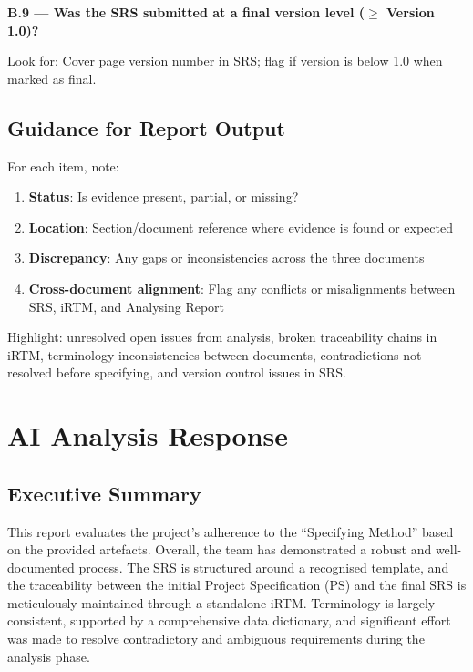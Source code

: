 \documentclass[11pt,a4paper]{article}
\begin{document}
\vspace{0.4em}

\textbf{B.9 --- Was the SRS submitted at a final version level ($\geq$ Version 1.0)?}

Look for: Cover page version number in SRS; flag if version is below 1.0 when marked as final.

\subsection*{Guidance for Report Output}

For each item, note:

\begin{enumerate}
\item \textbf{Status}: Is evidence present, partial, or missing?
\item \textbf{Location}: Section/document reference where evidence is found or expected
\item \textbf{Discrepancy}: Any gaps or inconsistencies across the three documents
\item \textbf{Cross-document alignment}: Flag any conflicts or misalignments between SRS, iRTM, and Analysing Report
\end{enumerate}

Highlight: unresolved open issues from analysis, broken traceability chains in iRTM, terminology inconsistencies between documents, contradictions not resolved before specifying, and version control issues in SRS.

\newpage
\section{AI Analysis Response}

\subsection{Executive Summary}

This report evaluates the project's adherence to the ``Specifying Method'' based on the provided artefacts. Overall, the team has demonstrated a robust and well-documented process. The SRS is structured around a recognised template, and the traceability between the initial Project Specification (PS) and the final SRS is meticulously maintained through a standalone iRTM. Terminology is largely consistent, supported by a comprehensive data dictionary, and significant effort was made to resolve contradictory and ambiguous requirements during the analysis phase.
\end{document}
